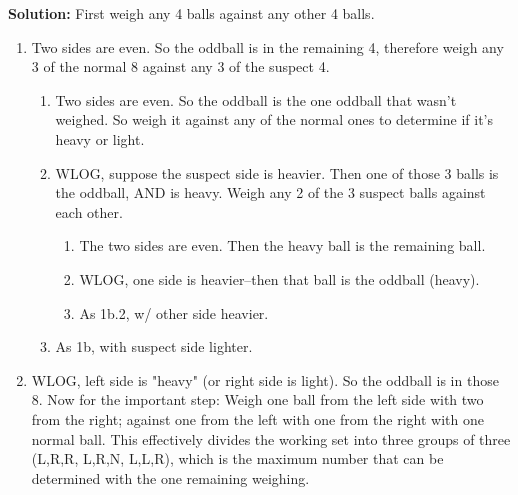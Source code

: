 \documentclass{article}
\providecommand{\soln}{\textbf{Solution: }}
\begin{document}
\begin{enumerate}[label=\Alph*.]
        \soln First weigh any 4 balls against any other 4 balls.
        
        \begin{enumerate}[label=\textbf{Case \arabic*.}]
            \item Two sides are even. So the oddball is in the remaining 4, therefore weigh any 3 of the normal 8 against any 3 of the suspect 4.
            
            \begin{enumerate}[label=(\alph*)]
                \item Two sides are even. So the oddball is the one oddball that wasn't weighed. So weigh it against any of the normal ones to determine if it's heavy or light.
                \item WLOG, suppose the suspect side is heavier. Then one of those 3 balls is the oddball, AND is heavy. Weigh any 2 of the 3 suspect balls against each other.
                
                \begin{enumerate}[label=\roman*]
                    \item The two sides are even. Then the heavy ball is the remaining ball.
                    \item WLOG, one side is heavier--then that ball is the oddball (heavy).
                    \item As 1b.2, w/ other side heavier.
                \end{enumerate}
                
                \item As 1b, with suspect side lighter.
                
            \end{enumerate}
            
            \item WLOG, left side is "heavy" (or right side is light). So the oddball is in those 8. Now for the important step:
            Weigh one ball from the left side with two from the right; against one from the left with one from the right with one normal ball.
            This effectively divides the working set into three groups of three ({L,R,R}, {L,R,N}, {L,L,R}), which is the maximum number that can be determined with the one remaining weighing.
            

\end{enumerate}
\end{enumerate}
\end{document}
